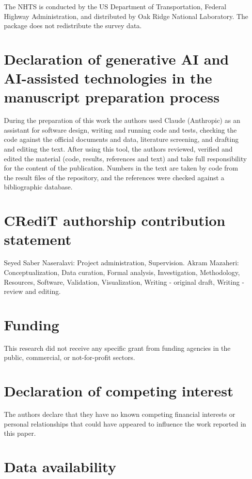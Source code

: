 \documentclass[preprint,12pt, a4paper]{elsarticle}
\begin{document}
The NHTS is conducted by the US Department of Transportation, Federal Highway Administration, and distributed by Oak Ridge National Laboratory. The package does not redistribute the survey data.

\section*{Declaration of generative AI and AI-assisted technologies in the manuscript preparation process}

During the preparation of this work the authors used Claude (Anthropic) as an assistant for software design, writing and running code and tests, checking the code against the official documents and data, literature screening, and drafting and editing the text. After using this tool, the authors reviewed, verified and edited the material (code, results, references and text) and take full responsibility for the content of the publication. Numbers in the text are taken by code from the result files of the repository, and the references were checked against a bibliographic database.

\section*{CRediT authorship contribution statement}

Seyed Saber Naseralavi: Project administration, Supervision. Akram Mazaheri: Conceptualization, Data curation, Formal analysis, Investigation, Methodology, Resources, Software, Validation, Visualization, Writing - original draft, Writing - review and editing.

\section*{Funding}

This research did not receive any specific grant from funding agencies in the public, commercial, or not-for-profit sectors.

\section*{Declaration of competing interest}

The authors declare that they have no known competing financial interests or personal relationships that could have appeared to influence the work reported in this paper.

\section*{Data availability}
\end{document}
